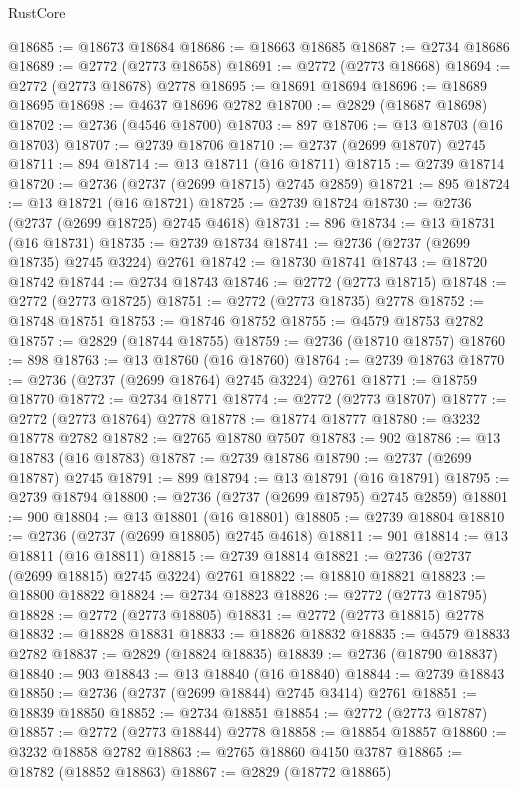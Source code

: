 \begin{lexlean}{RustCore}
\begin{coremodule}
@18685 := @18673 @18684
@18686 := @18663 @18685
@18687 := @2734 @18686
@18689 := @2772 (@2773 @18658)
@18691 := @2772 (@2773 @18668)
@18694 := @2772 (@2773 @18678) @2778
@18695 := @18691 @18694
@18696 := @18689 @18695
@18698 := @4637 @18696 @2782
@18700 := @2829 (@18687 @18698)
@18702 := @2736 (@4546 @18700)
@18703 := 897
@18706 := @13 @18703 (@16 @18703)
@18707 := @2739 @18706
@18710 := @2737 (@2699 @18707) @2745
@18711 := 894
@18714 := @13 @18711 (@16 @18711)
@18715 := @2739 @18714
@18720 := @2736 (@2737 (@2699 @18715) @2745 @2859)
@18721 := 895
@18724 := @13 @18721 (@16 @18721)
@18725 := @2739 @18724
@18730 := @2736 (@2737 (@2699 @18725) @2745 @4618)
@18731 := 896
@18734 := @13 @18731 (@16 @18731)
@18735 := @2739 @18734
@18741 := @2736 (@2737 (@2699 @18735) @2745 @3224) @2761
@18742 := @18730 @18741
@18743 := @18720 @18742
@18744 := @2734 @18743
@18746 := @2772 (@2773 @18715)
@18748 := @2772 (@2773 @18725)
@18751 := @2772 (@2773 @18735) @2778
@18752 := @18748 @18751
@18753 := @18746 @18752
@18755 := @4579 @18753 @2782
@18757 := @2829 (@18744 @18755)
@18759 := @2736 (@18710 @18757)
@18760 := 898
@18763 := @13 @18760 (@16 @18760)
@18764 := @2739 @18763
@18770 := @2736 (@2737 (@2699 @18764) @2745 @3224) @2761
@18771 := @18759 @18770
@18772 := @2734 @18771
@18774 := @2772 (@2773 @18707)
@18777 := @2772 (@2773 @18764) @2778
@18778 := @18774 @18777
@18780 := @3232 @18778 @2782
@18782 := @2765 @18780 @7507
@18783 := 902
@18786 := @13 @18783 (@16 @18783)
@18787 := @2739 @18786
@18790 := @2737 (@2699 @18787) @2745
@18791 := 899
@18794 := @13 @18791 (@16 @18791)
@18795 := @2739 @18794
@18800 := @2736 (@2737 (@2699 @18795) @2745 @2859)
@18801 := 900
@18804 := @13 @18801 (@16 @18801)
@18805 := @2739 @18804
@18810 := @2736 (@2737 (@2699 @18805) @2745 @4618)
@18811 := 901
@18814 := @13 @18811 (@16 @18811)
@18815 := @2739 @18814
@18821 := @2736 (@2737 (@2699 @18815) @2745 @3224) @2761
@18822 := @18810 @18821
@18823 := @18800 @18822
@18824 := @2734 @18823
@18826 := @2772 (@2773 @18795)
@18828 := @2772 (@2773 @18805)
@18831 := @2772 (@2773 @18815) @2778
@18832 := @18828 @18831
@18833 := @18826 @18832
@18835 := @4579 @18833 @2782
@18837 := @2829 (@18824 @18835)
@18839 := @2736 (@18790 @18837)
@18840 := 903
@18843 := @13 @18840 (@16 @18840)
@18844 := @2739 @18843
@18850 := @2736 (@2737 (@2699 @18844) @2745 @3414) @2761
@18851 := @18839 @18850
@18852 := @2734 @18851
@18854 := @2772 (@2773 @18787)
@18857 := @2772 (@2773 @18844) @2778
@18858 := @18854 @18857
@18860 := @3232 @18858 @2782
@18863 := @2765 @18860 @4150 @3787
@18865 := @18782 (@18852 @18863)
@18867 := @2829 (@18772 @18865)

\end{coremodule}
\end{lexlean}
